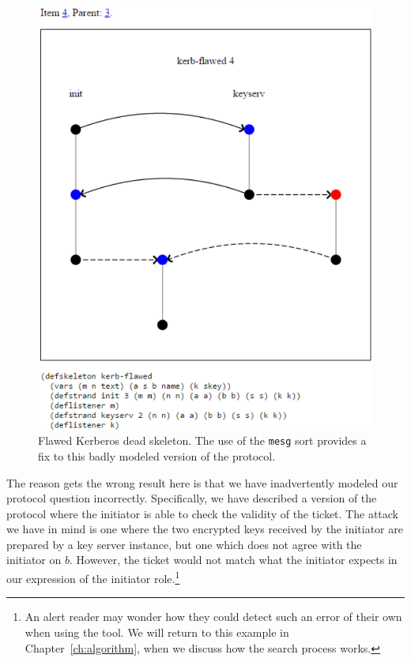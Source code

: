 \begin{figure}
\centering
\includegraphics{kerb_skel4}
\caption[Flawed Kerberos dead skeleton]{Flawed Kerberos dead skeleton.  The use of the \texttt{mesg} sort provides a fix to this badly modeled version of the protocol.}
\label{fig:kerb-skel4}
\end{figure}

  The reason {\cpsa} gets the wrong
result here is that we have inadvertently modeled our protocol
question incorrectly.  Specifically, we have described a version of
the protocol where the initiator is able to check the validity of the
ticket.  The attack we have in mind is one where the two encrypted
keys received by the initiator are prepared by a key server instance,
but one which does not agree with the initiator on $b$.  However, the
ticket would not match what the initiator expects in our expression of
the initiator role.\footnote{An alert reader may wonder how they could
  detect such an error of their own when using the tool.  We will
  return to this example in Chapter~\ref{ch:algorithm}, when we
  discuss how the {\cpsa} search process works.}

